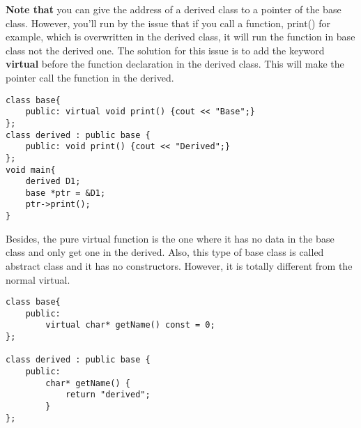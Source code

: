 \documentclass{article}
\begin{document}
\textbf{Note that} you can give the address of a derived class to a pointer of the base class.
However, you'll run by the issue that if you call a function, print() for example, which is overwritten in the derived class, it will run the function in base class not the derived one.
The solution for this issue is to add the keyword \textbf{virtual} before the function declaration in the derived class. This will make the pointer call the function in the derived. 

\begin{lstlisting}
class base{
	public: virtual void print() {cout << "Base";}
};
class derived : public base {
	public:	void print() {cout << "Derived";}
};
void main{
	derived D1;
	base *ptr = &D1;
	ptr->print();
}
\end{lstlisting}

Besides, the pure virtual function is the one where it has no data in the base class and only get one in the derived. Also, this type of base class is called abstract class and it has no constructors.
However, it is totally different from the normal virtual.

\begin{lstlisting}
class base{
	public:
		virtual char* getName() const = 0;
};

class derived : public base {
	public:
		char* getName() {
			return "derived";	
		}
};
\end{lstlisting}

\newpage
\begin{figure}[h] 
\end{figure}
\end{document}
